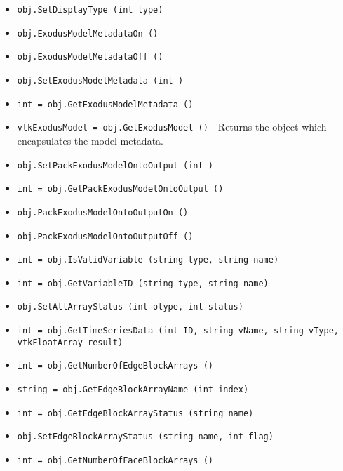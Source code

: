 \begin{itemize}
\item  \verb|obj.SetDisplayType (int type)|

\item  \verb|obj.ExodusModelMetadataOn ()|

\item  \verb|obj.ExodusModelMetadataOff ()|

\item  \verb|obj.SetExodusModelMetadata (int )|

\item  \verb|int = obj.GetExodusModelMetadata ()|

\item  \verb|vtkExodusModel = obj.GetExodusModel ()| -    Returns the object which encapsulates the model metadata.

\item  \verb|obj.SetPackExodusModelOntoOutput (int )|

\item  \verb|int = obj.GetPackExodusModelOntoOutput ()|

\item  \verb|obj.PackExodusModelOntoOutputOn ()|

\item  \verb|obj.PackExodusModelOntoOutputOff ()|

\item  \verb|int = obj.IsValidVariable (string type, string name)|

\item  \verb|int = obj.GetVariableID (string type, string name)|

\item  \verb|obj.SetAllArrayStatus (int otype, int status)|

\item  \verb|int = obj.GetTimeSeriesData (int ID, string vName, string vType, vtkFloatArray result)|

\item  \verb|int = obj.GetNumberOfEdgeBlockArrays ()|

\item  \verb|string = obj.GetEdgeBlockArrayName (int index)|

\item  \verb|int = obj.GetEdgeBlockArrayStatus (string name)|

\item  \verb|obj.SetEdgeBlockArrayStatus (string name, int flag)|

\item  \verb|int = obj.GetNumberOfFaceBlockArrays ()|


\end{itemize}
